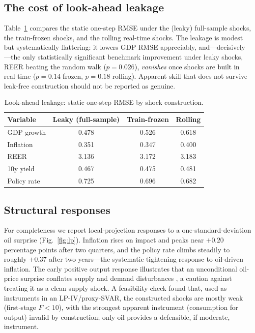\documentclass[conference]{IEEEtran}
\begin{document}
\subsection{The cost of look-ahead leakage}
Table~\ref{tab:leak} compares the static one-step RMSE under the (leaky)
full-sample shocks, the train-frozen shocks, and the rolling real-time shocks.
The leakage is modest but systematically flattering: it lowers GDP RMSE
appreciably, and---decisively---the only statistically significant benchmark
improvement under leaky shocks, REER beating the random walk
($p=0.026$), \emph{vanishes} once shocks are built in real time
($p=0.14$ frozen, $p=0.18$ rolling). Apparent skill that does not survive
leak-free construction should not be reported as genuine.

\begin{table}[t]
\caption{Look-ahead leakage: static one-step RMSE by shock construction.}
\label{tab:leak}
\centering
\footnotesize
\begin{tabular}{@{}lccc@{}}
\toprule
Variable & Leaky (full-sample) & Train-frozen & Rolling \\
\midrule
GDP growth  & 0.478 & 0.526 & 0.618 \\
Inflation   & 0.351 & 0.347 & 0.400 \\
REER        & 3.136 & 3.172 & 3.183 \\
10y yield   & 0.467 & 0.475 & 0.481 \\
Policy rate & 0.725 & 0.696 & 0.682 \\
\bottomrule
\end{tabular}
\end{table}

\subsection{Structural responses}
For completeness we report local-projection responses to a one-standard-deviation
oil surprise (Fig.~\ref{fig:lp}). Inflation rises on impact and peaks near
$+0.20$ percentage points after two quarters, and the policy rate climbs steadily
to roughly $+0.37$ after two years---the systematic tightening response to
oil-driven inflation. The early positive output response illustrates that an
unconditional oil-price surprise conflates supply and demand disturbances
\cite{kilian2009}, a caution against treating it as a clean supply shock. A
feasibility check found that, used as instruments in an LP-IV/proxy-SVAR, the
constructed shocks are mostly weak (first-stage $F<10$), with the strongest
apparent instrument (consumption for output) invalid by construction; only oil
provides a defensible, if moderate, instrument.
\end{document}
